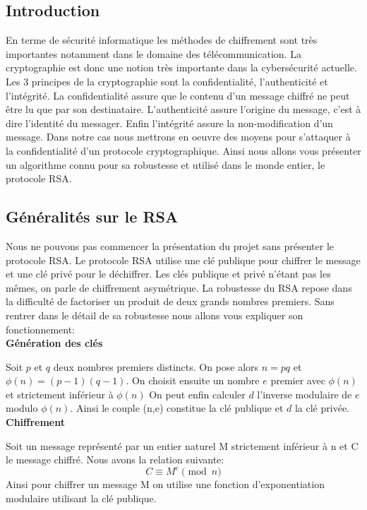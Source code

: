 \subsection{Introduction}
En terme de sécurité informatique les méthodes de chiffrement sont très importantes notamment dans le domaine des télécommunication. La cryptographie est donc une notion très importante dans la cybersécurité actuelle. Les 3 principes de la cryptographie sont la confidentialité, l'authenticité et l'intégrité.
La confidentialité assure que le contenu d'un message chiffré ne peut être lu que par son destinataire.
L'authenticité assure l'origine du message, c'est à dire l'identité du messager.
Enfin l'intégrité assure la non-modification d'un message.
Dans notre cas nous mettrons en oeuvre des moyens pour s'attaquer à la confidentialité d'un protocole cryptographique. 
Ainsi nous allons vous présenter un algorithme connu pour sa robustesse et utilisé dans le monde entier, le protocole RSA.
\newpage
\subsection{Généralités sur le RSA}
Nous ne pouvons pas commencer la présentation du projet sans présenter le protocole RSA.
Le protocole RSA utilise une clé publique pour chiffrer le message et une clé privé pour le déchiffrer. Les clés publique et privé n'étant pas les mêmes, on parle de chiffrement asymétrique.
La robustesse du RSA repose dans la difficulté de factoriser un produit de deux grands nombres premiers.
Sans rentrer dans le détail de sa robustesse nous allons vous expliquer son fonctionnement:
\\

\textbf{Génération des clés}


Soit $p$ et $q$ deux nombres premiers distincts. On pose alors $n=pq$ et $\phi(n)=(p-1)(q-1)$.
On choisit ensuite un nombre $e$ premier avec $\phi(n)$ et strictement inférieur à $\phi(n)$
On peut enfin calculer $d$ l'inverse modulaire de $e$ modulo $\phi(n)$.
Ainsi le couple (n,e) constitue la clé publique et $d$ la clé privée.
\\

\textbf{Chiffrement}


Soit un message représenté par un entier naturel M strictement inférieur à n et C le message chiffré.
Nous avons la relation suivante:
\begin{equation}
\label{eq:chiffrement}
C \equiv M^e \pmod{n}
\end{equation}
Ainsi pour chiffrer un message M on utilise une fonction d'exponentiation modulaire utilisant la clé publique.
\\

